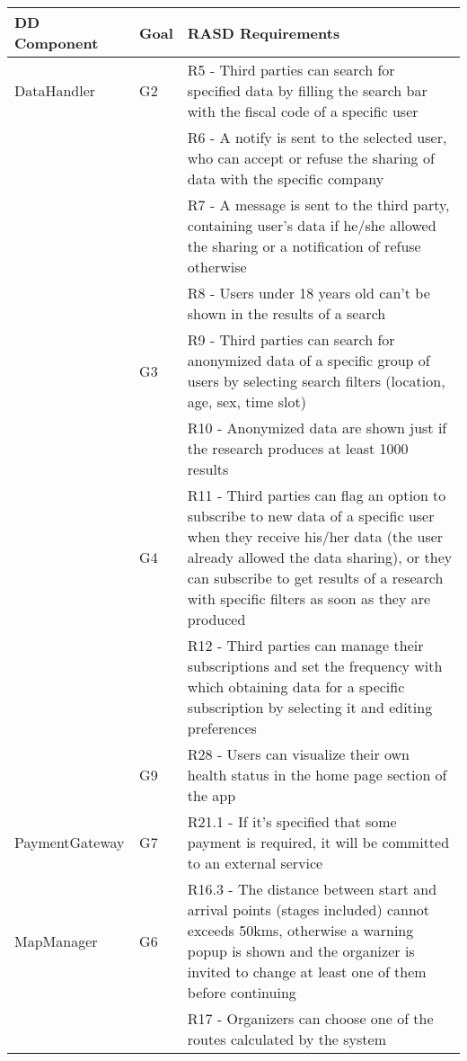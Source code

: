 \begin{table}[]
\begin{adjustbox}{width=\textwidth}
\begin{tabular}{|p{}|p{}|p{}|}
\hline
\textbf{DD Component} & \textbf{Goal} & \textbf{RASD Requirements}\\ \hline					
DataHandler			& G2	 & R5 - Third parties can search for specified data by filling the search bar with the fiscal code of a specific user \\[10pt]
					&		& R6 -	A notify is sent to the selected user, who can accept or refuse the sharing of data with the specific company \\[10pt]
					&		& R7 - A message is sent to the third party, containing user's data if he/she allowed the sharing or a notification of refuse otherwise	\\[10pt]
					&		& R8 - Users under 18 years old can't be shown in the results of a search	\\[10pt]
					& G3	 & R9 - Third parties can search for anonymized data of a specific group of users by selecting search filters (location, age, sex, time slot) \\[10pt]
					&		& R10 - Anonymized data are shown just if the research produces at least 1000 results	 \\[10pt]
					& G4	 & R11 -	Third parties can flag an option to subscribe to new data of a specific user when they receive his/her data (the user already allowed the data sharing), or they can subscribe to get results of a research with specific filters as soon as they are produced \\[10pt]
					&		& R12 - Third parties can manage their subscriptions and set the frequency with which obtaining data for a specific subscription by selecting it and editing preferences	\\[10pt]
					& G9	 & R28 - Users can visualize their own health status in the home page section of the app	\\[10pt] \hline
PaymentGateway		& G7	 & R21.1	 - If it's specified that some payment is required, it will be committed to an external service \\[10pt] \hline
MapManager			& G6	 & R16.3 - The distance between start and arrival points (stages included) cannot exceeds 50kms, otherwise a warning popup is shown and the organizer is invited to change at least one of them before continuing \\[10pt]
					&		& R17 - Organizers can choose one of the routes calculated by the system \\[10pt]

\end{tabular}
\end{adjustbox}
\end{table}

